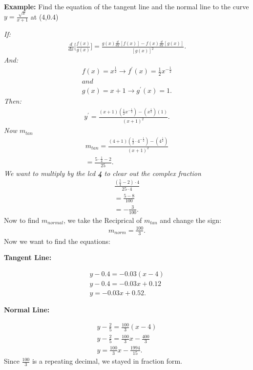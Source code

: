 \documentclass{report}
\begin{document}
  \pagebreak \bigbreak \noindent
  \begin{mdframed}
    \textbf{Example:} Find the equation of the tangent line and the normal line to the curve $y = \frac{ \sqrt{x}}{x+1}$ at (4,0.4)
  \end{mdframed}

  \bigbreak \noindent 
  \textit{If:}
  \begin{align*}
    \frac{d}{dx}\bigg[ \frac{f(x)}{g(x)}\bigg] = \frac{g(x) \frac{d}{dx}[f(x)] - f(x) \frac{d}{dx}[g(x)]}{[g(x)]^2} 
  .\end{align*}
  \bigbreak \noindent 
  \textit{And:}
  \begin{align*}
    f(x) = x ^{\frac{1}{2}} \longrightarrow f ^{\prime}(x) = \frac{1}{2}x ^{-\frac{1}{2}} \\
    and \\
    g(x) = x+1 \longrightarrow g ^{\prime}(x) = 1
  .\end{align*}
  \bigbreak \noindent 
  \textit{Then:}
  \begin{align*}
    y ^{\prime} = \frac{(x+1)( \frac{1}{2}x ^{-\frac{1}{2}}) - (x ^{\frac{1}{2}})(1)}{(x+1)^2}
  .\end{align*}
  \bigbreak \noindent 
  \textit{Now $m_{tan}$}
  \begin{align*}
    m_{tan} = \frac{(4+1)( \frac{1}{2} \cdot 4 ^{-\frac{1}{2}}) - (4 ^{\frac{1}{2}})}{(x+1)^2} \\ 
    = \frac{5 \cdot \frac{1}{4} - 2}{25} 
  .\end{align*}
  \bigbreak \noindent 
  \textit{We want to multiply by the lcd \textbf{\textit{4}} to clear out the complex fraction}
  \begin{align*}
    \frac{(\frac{5}{4} - 2) \cdot 4}{25 \cdot 4} \\ 
    = \frac{5-8}{100} \\ 
    = - \frac{3}{100}
  .\end{align*}
  \bigbreak \noindent 
  Now to find $m_{normal}$, we take the Reciprical of $m_{tan}$ and change the sign:
  \begin{align*}
    m_{norm} = \frac{100}{3}
  .\end{align*}
  \bigbreak \noindent 
  Now we want to find the equations:
  \begin{center}
    \textbf{Tangent Line:}
  \end{center}
  \begin{align*}
    y - 0.4 = - 0.03(x-4) \\ 
    y-0.4 = -0.03x+0.12 \\ 
    y = -0.03x+0.52
  .\end{align*}
  \begin{center}
    \textbf{Normal Line:}
  \end{center}
  \begin{align*}
    y- \frac{2}{5} = \frac{100}{3}(x-4) \\ 
    y - \frac{2}{5} = \frac{100}{3}x - \frac{400}{3} \\ 
    y = \frac{100}{3}x - \frac{1994}{15}
  .\end{align*}
  Since $\frac{100}{3}$ is a repeating decimal, we stayed in fraction form.
\end{document}
